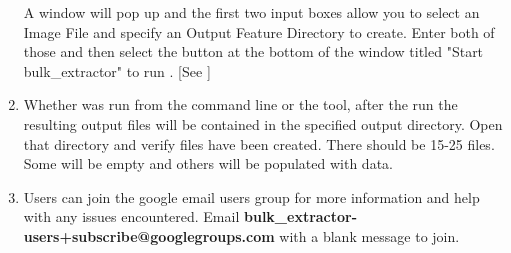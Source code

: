 \documentclass[11pt]{article} %
\begin{document}
\begin{enumerate}
\noindent
\begin{minipage}{\linewidth}
\label{fig:runBulk}
\end{minipage}

A window will pop up and the first two input boxes allow you to select an Image File and specify an Output Feature Directory to create. Enter both of those and then select the button at the bottom of the window titled "Start bulk\_extractor" to run \bulk.
[See \textbf{} \textbf{}]

\item Whether \bulk was run from the command line or the \viewer tool, after the run the resulting output files will be contained in the specified output directory. Open that directory and verify files have been created. There should be 15-25 files. Some will be empty and others will be populated with data.

\item Users can join the google email users group for more information and help with any issues encountered. Email \textbf{bulk\_extractor-users+subscribe@googlegroups.com} with a blank message to join.
\end{enumerate}
\newpage
\end{document}

